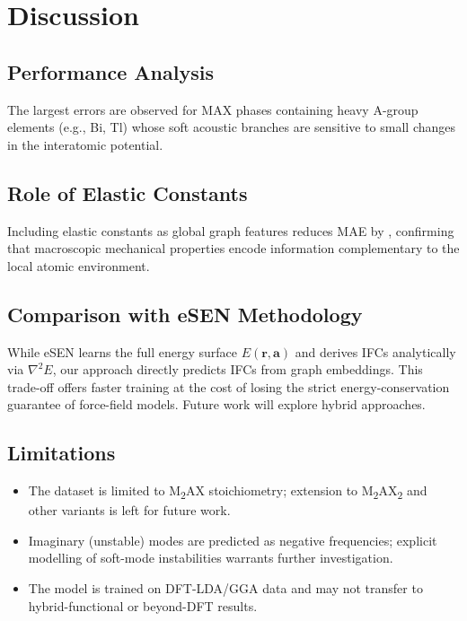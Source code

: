 \section{Discussion}

\subsection{Performance Analysis}


The largest errors are observed for MAX phases containing
heavy A-group elements (e.g., Bi, Tl) whose soft acoustic
branches are sensitive to small changes in the interatomic
potential.

\subsection{Role of Elastic Constants}

Including elastic constants as global graph features reduces
MAE by , confirming that macroscopic mechanical
properties encode information complementary to the local
atomic environment.

\subsection{Comparison with eSEN Methodology}

While eSEN learns the full energy surface $E(\mathbf{r},\mathbf{a})$
and derives IFCs analytically via $\nabla^2 E$,
our approach directly predicts IFCs from graph embeddings.
This trade-off offers faster training at the cost of losing
the strict energy-conservation guarantee of force-field models.
Future work will explore hybrid approaches.

\subsection{Limitations}

\begin{itemize}
  \item The dataset is limited to M\textsubscript{2}AX stoichiometry;
        extension to M\textsubscript{2}AX\textsubscript{2} and other
        variants is left for future work.
  \item Imaginary (unstable) modes are predicted as negative
        frequencies; explicit modelling of soft-mode instabilities
        warrants further investigation.
  \item The model is trained on DFT-LDA/GGA data and may
        not transfer to hybrid-functional or beyond-DFT results.
\end{itemize}
